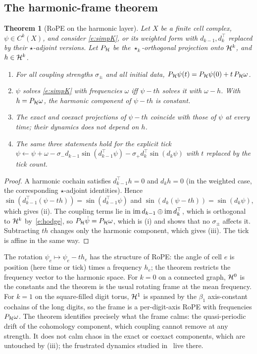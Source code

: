 \documentclass[10pt]{article}
\newtheorem{thm}{Theorem}[section]
\theoremstyle{definition}
\begin{document}
\subsection{The harmonic-frame theorem}
\begin{thm}[RoPE on the harmonic layer]\label{t:hf}
Let $X$ be a finite cell complex, $\psi\in C^k(X)$, and consider \eqref{e:simpK}, or its weighted form with $d_{k-1},d_k^{\top}$ replaced by their $\star$-adjoint versions. Let $P_\mathcal H$ be the $\star_k$-orthogonal projection onto $\mathcal H^k$, and $h\in\mathcal H^k$.
\begin{enumerate}\itemsep1pt
\item[(i)] For all coupling strengths $\sigma_\pm$ and all initial data, $P_\mathcal H\psi(t)=P_\mathcal H\psi(0)+t\,P_\mathcal H\omega$.
\item[(ii)] $\psi$ solves \eqref{e:simpK} with frequencies $\omega$ iff $\psi-th$ solves it with $\omega-h$. With $h=P_\mathcal H\omega$, the harmonic component of $\psi-th$ is constant.
\item[(iii)] The exact and coexact projections of $\psi-th$ coincide with those of $\psi$ at every time; their dynamics does not depend on $h$.
\item[(iv)] The same three statements hold for the explicit tick $\psi\leftarrow\psi+\omega-\sigma_-d_{k-1}\sin(d_{k-1}^{\top}\psi)-\sigma_+d_k^{\top}\sin(d_k\psi)$ with $t$ replaced by the tick count.
\end{enumerate}
\end{thm}
\begin{proof}
A harmonic cochain satisfies $d_{k-1}^{\top}h=0$ and $d_kh=0$ (in the weighted case, the corresponding $\star$-adjoint identities). Hence $\sin(d_{k-1}^{\top}(\psi-th))=\sin(d_{k-1}^{\top}\psi)$ and $\sin(d_k(\psi-th))=\sin(d_k\psi)$, which gives (ii). The coupling terms lie in $\operatorname{im} d_{k-1}\oplus\operatorname{im} d_k^{\top}$, which is orthogonal to $\mathcal H^k$ by~\eqref{e:hodge}, so $P_\mathcal H\dot\psi=P_\mathcal H\omega$, which is (i) and shows that no $\sigma_\pm$ affects it. Subtracting $th$ changes only the harmonic component, which gives (iii). The tick is affine in the same way.
\end{proof}
\noindent The rotation $\psi_e\mapsto\psi_e-th_e$ has the structure of RoPE: the angle of cell $e$ is position (here time or tick) times a frequency $h_e$; the theorem restricts the frequency vector to the harmonic space. For $k=0$ on a connected graph, $\mathcal H^0$ is the constants and the theorem is the usual rotating frame at the mean frequency. For $k=1$ on the square-filled digit torus, $\mathcal H^1$ is spanned by the $\beta_1$ axis-constant cochains of the long digits, so the frame is a per-digit-axis RoPE with frequencies $P_\mathcal H\omega$. The theorem identifies precisely what the frame calms: the quasi-periodic drift of the cohomology component, which coupling cannot remove at any strength. It does not calm chaos in the exact or coexact components, which are untouched by (iii); the frustrated dynamics studied in~\cite{arnaudon} live there.
\end{document}
